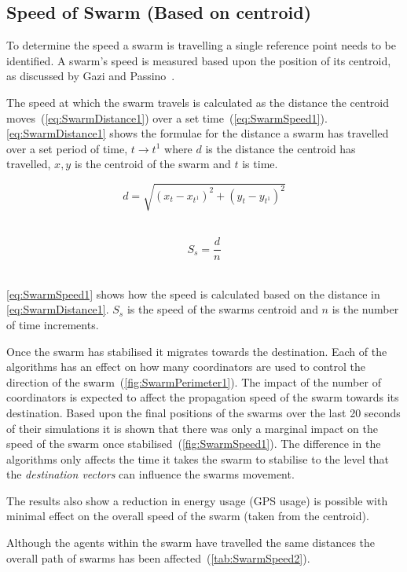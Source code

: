 \subsection{Speed of Swarm (Based on centroid)}
To determine the speed a swarm is travelling a single reference point needs to be identified. A swarm's speed is measured based upon the position of its centroid, as discussed by Gazi and Passino~\cite{GP:04, GP:02}.

The speed at which the swarm travels is calculated as the distance the centroid moves~(\autoref{eq:SwarmDistance1}) over a set time~(\autoref{eq:SwarmSpeed1}). \autoref{eq:SwarmDistance1} shows the formulae for the distance a swarm has travelled over a set period of time, $t \rightarrow t^{1}$ where $d$ is the distance the centroid has travelled, $x,y$ is the centroid of the swarm and $t$ is time.

\begin{equation}\label{eq:SwarmDistance1}
d = \sqrt{(x_{t}-x_{t^1})^2+(y_{t}-y_{t^1})^2}
\end{equation}‎

\begin{equation}\label{eq:SwarmSpeed1}
S_s = \frac{d}{n}
\end{equation}‎

\autoref{eq:SwarmSpeed1} shows how the speed is calculated based on the distance in \autoref{eq:SwarmDistance1}. $S_s$ is the speed of the swarms centroid and $n$ is the number of time increments.

Once the swarm has stabilised it migrates towards the destination. Each of the algorithms has an effect on how many coordinators are used to control the direction of the swarm~(\autoref{fig:SwarmPerimeter1}). The impact of the number of coordinators is expected to affect the propagation speed of the swarm towards its destination. Based upon the final positions of the swarms over the last 20 seconds of their simulations it is shown that there was only a marginal impact on the speed of the swarm once stabilised~(\autoref{fig:SwarmSpeed1}). The difference in the algorithms only affects the time it takes the swarm to stabilise to the level that the \textit{destination vectors} can influence the swarms movement.

The results also show a reduction in energy usage (GPS usage) is possible with minimal effect on the overall speed of the swarm (taken from the centroid). 

Although the agents within the swarm have travelled the same distances the overall path of swarms has been affected~(\autoref{tab:SwarmSpeed2}).

